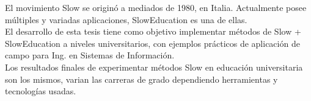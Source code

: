 % 
% 
%
El movimiento Slow se origin\'o a mediados de 1980, en Italia. Actualmente posee m\'ultiples y variadas aplicaciones, SlowEducation es una de ellas.\\
El desarrollo de esta tesis tiene como objetivo implementar m\'etodos de Slow + SlowEducation a niveles universitarios, con ejemplos pr\'acticos de 
aplicaci\'on de campo para Ing. en Sistemas de Informaci\'on.\\
Los resultados finales de experimentar m\'etodos Slow en educaci\'on universitaria son los mismos, varian las carreras de grado dependiendo herramientas 
y tecnolog\'ias usadas.

